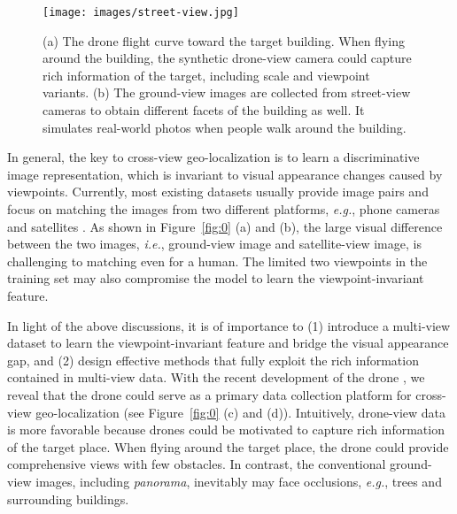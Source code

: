 \documentclass[sigconf]{acmart}
\def\eg{\emph{e.g.}}
\def\ie{\emph{i.e.}}
\begin{document}
\begin{figure*}[t]
\begin{center}
    \texttt{[image: images/street-view.jpg]}
\end{center}
\vspace{-.2in}
     \caption{(a) The drone flight curve toward the target building. When flying around the building, the synthetic drone-view camera could capture rich information of the target, including scale and viewpoint variants. (b) The ground-view images are collected from street-view cameras to obtain different facets of the building as well. It simulates real-world photos when people walk around the building.
     }\label{fig:spiral}
\end{figure*}

In general, the key to cross-view geo-localization is to learn a discriminative image representation, which is invariant to visual appearance changes caused by viewpoints. Currently, most existing datasets usually provide image pairs and focus on matching the images from two different platforms, \eg, phone cameras and satellites \cite{zhai2017predicting,liu2019lending}. As shown in Figure~\ref{fig:0} (a) and (b), the large visual difference between the two images, \ie, ground-view image and satellite-view image, is challenging to matching even for a human. The limited two viewpoints in the training set may also compromise the model to learn the viewpoint-invariant feature.


In light of the above discussions, it is of importance to (1) introduce a multi-view dataset to learn the viewpoint-invariant feature and bridge the visual appearance gap, and (2) design effective methods that fully exploit the rich information contained in multi-view data. With the recent development of the drone \cite{zhu2018vision,hsieh2017drone,li2017visual}, we reveal that the  drone could serve as a primary data collection platform for cross-view geo-localization (see Figure~\ref{fig:0} (c) and (d)). Intuitively, drone-view data is more favorable because drones could be motivated to capture rich information of the target place. When flying around the target place, the drone could provide comprehensive views with few obstacles. In contrast, the conventional ground-view images, including \emph{panorama}, inevitably may face occlusions, \eg, trees and surrounding buildings. 
\end{document}
